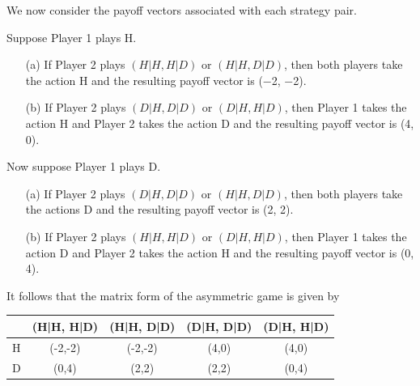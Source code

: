 \documentclass[]{report}
\begin{document}
We now consider the payoff vectors associated with each strategy
pair.
\begin{framed}
\noindent Suppose Player 1 plays H.
\begin{itemize}
	\item[(a)] If Player 2 plays $(H|H, H|D)$ or $(H|H, D|D)$, then both players
take the action H and the resulting payoff vector is (−2, −2).
	\item[(b)] If Player 2 plays $(D|H, D|D)$ or $(D|H, H|D)$, then Player 1
takes the action H and Player 2 takes the action D and the
resulting payoff vector is (4, 0).
\end{itemize}
\end{framed}

Now suppose Player 1 plays D.
\begin{itemize}
	\item[(a)] If Player 2 plays $(D|H, D|D)$ or $(H|H, D|D)$, then both players
	take the actions D and the resulting payoff vector is (2, 2).
	\item[(b)] If Player 2 plays $(H|H, H|D)$ or $(D|H, H|D)$, then Player 1 takes
	the action D and Player 2 takes the action H and the resulting
	payoff vector is (0, 4).
\end{itemize}

It follows that the matrix form of the asymmetric game is given by


\begin{tabular}{|c|c|c|c|c|} \hline
  & (H|H, H|D) & (H|H, D|D) & (D|H, D|D) & (D|H, H|D)\\ \hline
H & (-2,-2) & (-2,-2)& (4,0) & (4,0)\\ \hline
D & (0,4) & (2,2) & (2,2) & (0,4)\\ \hline
\end{tabular}


\end{document}
